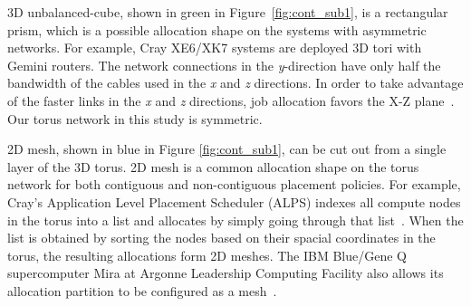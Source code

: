 3D unbalanced-cube, shown in green in Figure~\ref{fig:cont_sub1}, 
is a rectangular prism, which is a possible allocation shape 
on the systems with asymmetric networks. 
For example, Cray XE6/XK7 systems are deployed 3D tori with Gemini routers. 
The network connections in the \emph{y}-direction have 
only half the bandwidth of the cables used in the \emph{x} and \emph{z} directions. 
In order to take advantage of the faster links in the \emph{x} and \emph{z} directions, 
job allocation favors the X-Z plane~\cite{RF}. Our torus network in this study is symmetric.

2D mesh, shown in blue in Figure \ref{fig:cont_sub1}, 
can be cut out from a single layer of the 3D torus. 
2D mesh is a common allocation shape on the torus network 
for both contiguous and non-contiguous placement policies. 
For example, Cray's Application Level Placement Scheduler (ALPS) indexes 
all compute nodes in the torus into a list and 
allocates by simply going through that list~\cite{carl-cug}. 
When the list is obtained by sorting the nodes based on 
their spacial coordinates in the torus, 
the resulting allocations form 2D meshes. 
The IBM Blue/Gene Q supercomputer Mira at Argonne Leadership Computing Facility 
also allows its allocation partition to be configured as a mesh~\cite{zhou-ipdps}. 

